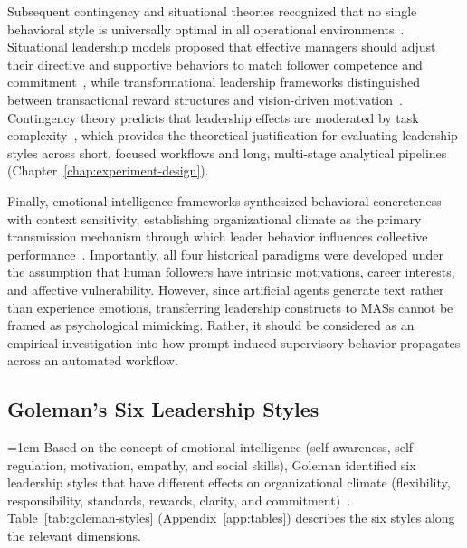 Subsequent contingency and situational theories recognized that no single behavioral style is universally optimal in all operational environments~\cite{ayman1995contingency}.
Situational leadership models proposed that effective managers should adjust their directive and supportive behaviors to match follower competence and commitment~\cite{world6020063}, 
while transformational leadership frameworks distinguished between transactional reward structures and vision-driven motivation~\cite{judge2004transformationalleadership, khanin2007contrastingburnsandbass}.
Contingency theory predicts that leadership effects are moderated by task complexity~\cite{ayman1995contingency, kwak2026leadershipcoordinationcontrolbehavioral}, 
which provides the theoretical justification for evaluating leadership styles across short, focused workflows and long, multi-stage analytical pipelines (Chapter~\ref{chap:experiment-design}).

Finally, emotional intelligence frameworks synthesized behavioral concreteness with context sensitivity, establishing organizational climate as the primary transmission mechanism through which leader behavior influences collective performance~\cite{goleman2000leadership}.
Importantly, all four historical paradigms were developed under the assumption that human followers have intrinsic motivations, career interests, and affective vulnerability.
However, since artificial agents generate text rather than experience emotions, transferring leadership constructs to \acp{MAS} cannot be framed as psychological mimicking.
Rather, it should be considered as an empirical investigation into how prompt-induced supervisory behavior propagates across an automated workflow.

\subsection{Goleman's Six Leadership Styles}
\label{subsec:goleman-styles}

{
\emergencystretch=1em
Based on the concept of emotional intelligence (self-awareness, self-regulation, motivation, empathy, and social skills), Goleman identified six leadership styles that have different effects on organizational climate (flexibility, responsibility, standards, rewards, clarity, and commitment)~\cite{goleman2000leadership}.
Table~\ref{tab:goleman-styles} (Appendix~\ref{app:tables}) describes the six styles along the relevant dimensions.
\par}

